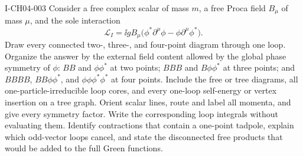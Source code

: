 \begin{exercise}{I-CH04-003}
Consider a free complex scalar of mass $m$, a free Proca field $B_\mu$ of
mass $\mu$, and the sole interaction
\begin{equation*}
 \mathcal L_I=\ii gB_\mu
 \bigl(\phi^*\partial^\mu\phi-\phi\partial^\mu\phi^*\bigr).
\end{equation*}
Draw every connected two-, three-, and four-point diagram through one loop.
Organize the answer by the external field content allowed by the global
phase symmetry of $\phi$: $BB$ and $\phi\phi^*$ at two points;
$BBB$ and $B\phi\phi^*$ at three points; and $BBBB$,
$BB\phi\phi^*$, and $\phi\phi\phi^*\phi^*$ at four points.  Include the
free or tree diagrams, all one-particle-irreducible loop cores, and every
one-loop self-energy or vertex insertion on a tree graph.  Orient scalar
lines, route and label all momenta, and give every symmetry factor.  Write
the corresponding loop integrals without evaluating them.  Identify
contractions that contain a one-point tadpole, explain which odd-vector
loops cancel, and state the disconnected free products that would be added
to the full Green functions.
\end{exercise}
